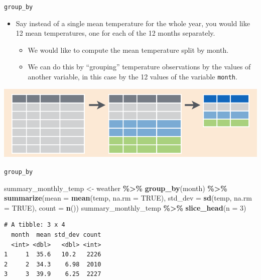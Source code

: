 \documentclass[
  ignorenonframetext,
]{beamer}
\newenvironment{Shaded}{\begin{snugshade}}{\end{snugshade}}
\newcommand{\AttributeTok}[1]{\textcolor[rgb]{0.13,0.29,0.53}{#1}}
\newcommand{\ConstantTok}[1]{\textcolor[rgb]{0.56,0.35,0.01}{#1}}
\newcommand{\DecValTok}[1]{\textcolor[rgb]{0.00,0.00,0.81}{#1}}
\newcommand{\FunctionTok}[1]{\textcolor[rgb]{0.13,0.29,0.53}{\textbf{#1}}}
\newcommand{\NormalTok}[1]{#1}
\newcommand{\OtherTok}[1]{\textcolor[rgb]{0.56,0.35,0.01}{#1}}
\newcommand{\SpecialCharTok}[1]{\textcolor[rgb]{0.81,0.36,0.00}{\textbf{#1}}}
\providecommand{\tightlist}{%
  \setlength{\itemsep}{0pt}\setlength{\parskip}{0pt}}
\begin{document}
\begin{frame}[fragile]{\texttt{group\_by}}
\protect\hypertarget{group_by}{}
\begin{itemize}
\item
  Say instead of a single mean temperature for the whole year, you would
  like 12 mean temperatures, one for each of the 12 months separately.

  \begin{itemize}
  \tightlist
  \item
    We would like to compute the mean temperature split by month.
  \item
    We can do this by ``grouping'' temperature observations by the
    values of another variable, in this case by the 12 values of the
    variable \texttt{month}.
  \end{itemize}
\end{itemize}

\begin{center}\includegraphics[width=0.8\linewidth,height=0.4\textheight]{week3_3} \end{center}
\end{frame}

\begin{frame}[fragile]{\texttt{group\_by}}
\protect\hypertarget{group_by-1}{}
\normalsize

\begin{Shaded}
\begin{Highlighting}[]
\NormalTok{summary\_monthly\_temp }\OtherTok{\textless{}{-}}\NormalTok{ weather }\SpecialCharTok{\%\textgreater{}\%} 
  \FunctionTok{group\_by}\NormalTok{(month) }\SpecialCharTok{\%\textgreater{}\%} 
  \FunctionTok{summarize}\NormalTok{(}\AttributeTok{mean =} \FunctionTok{mean}\NormalTok{(temp, }\AttributeTok{na.rm =} \ConstantTok{TRUE}\NormalTok{), }
            \AttributeTok{std\_dev =} \FunctionTok{sd}\NormalTok{(temp, }\AttributeTok{na.rm =} \ConstantTok{TRUE}\NormalTok{),}
            \AttributeTok{count =} \FunctionTok{n}\NormalTok{())}
\NormalTok{summary\_monthly\_temp }\SpecialCharTok{\%\textgreater{}\%} 
  \FunctionTok{slice\_head}\NormalTok{(}\AttributeTok{n =} \DecValTok{3}\NormalTok{)}
\end{Highlighting}
\end{Shaded}

\begin{verbatim}
# A tibble: 3 x 4
  month  mean std_dev count
  <int> <dbl>   <dbl> <int>
1     1  35.6   10.2   2226
2     2  34.3    6.98  2010
3     3  39.9    6.25  2227
\end{verbatim}

\normalsize
\end{frame}
\end{document}
